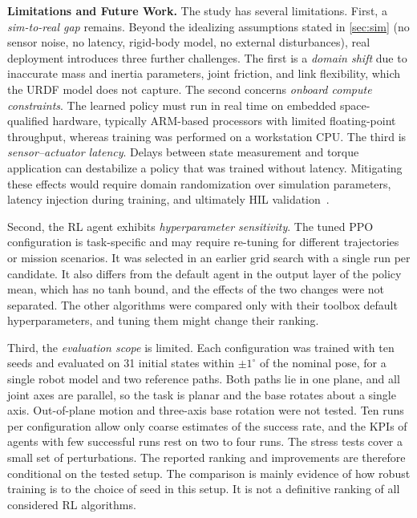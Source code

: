 \documentclass{ieeeaccess}
\begin{document}
\textbf{Limitations and Future Work.} The study has several limitations. First, a \emph{sim-to-real gap}
remains. Beyond the idealizing assumptions stated in \cref{sec:sim} (no sensor noise, no latency,
rigid-body model, no external disturbances), real deployment introduces three further challenges. The
first is a \emph{domain shift} due to inaccurate mass and inertia parameters, joint friction, and link
flexibility, which the URDF model does not capture. The second concerns \emph{onboard compute
constraints}. The learned policy must run in real time on embedded space-qualified hardware, typically
ARM-based processors with limited floating-point throughput, whereas training was performed on a
workstation CPU. The third is \emph{sensor--actuator latency}. Delays between state measurement and
torque application can destabilize a policy that was trained without latency. Mitigating these effects
would require domain randomization over simulation parameters, latency injection during training, and
ultimately HIL validation~\cite{b8}.

Second, the RL agent exhibits \emph{hyperparameter sensitivity}. The tuned PPO configuration is
task-specific and may require re-tuning for different trajectories or mission scenarios. It was selected
in an earlier grid search with a single run per candidate. It also differs from the default agent in the
output layer of the policy mean, which has no tanh bound, and the effects of the two changes were not
separated. The other algorithms were compared only with their toolbox default hyperparameters, and
tuning them might change their ranking.

Third, the \emph{evaluation scope} is limited. Each configuration was trained with ten seeds and
evaluated on 31 initial states within $\pm 1^\circ$ of the nominal pose, for a single robot model and
two reference paths. Both paths lie in one plane, and all joint axes are parallel, so the task is planar
and the base rotates about a single axis. Out-of-plane motion and three-axis base rotation were not
tested. Ten runs per configuration allow only coarse estimates of the success rate, and the KPIs of
agents with few successful runs rest on two to four runs. The stress tests cover a small set of
perturbations. The reported ranking and improvements are therefore conditional on the tested setup.
The comparison is mainly evidence of how robust training is to the choice of seed in this setup. It is
not a definitive ranking of all considered RL algorithms.
\end{document}
